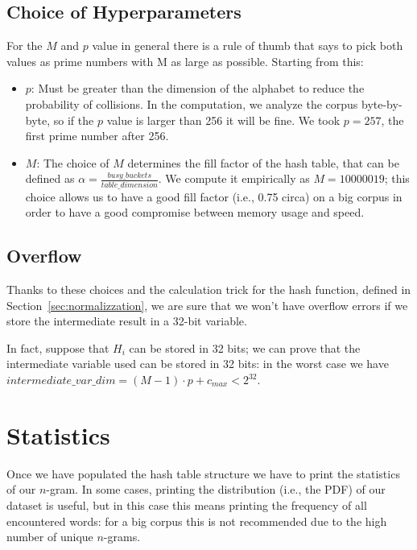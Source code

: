 \subsection{Choice of Hyperparameters}
For the $M$ and $p$ value in general there is a rule of thumb that says to pick both values as prime numbers with M as large as possible. Starting from this:
\begin{itemize}
    \item $p$: Must be greater than the dimension of the alphabet to reduce the probability of collisions. In the computation, we analyze the corpus byte-by-byte, so if the $p$ value is larger than 256 it will be fine. We took $p=257$, the first prime number after 256.
    \item $M$: The choice of $M$ determines the fill factor of the hash table, that can be defined as $\alpha=\tfrac{busy\_buckets}{table\_dimension}$. We compute it empirically as $M=10000019$; this choice allows us to have a good fill factor (i.e., 0.75 circa) on a big corpus in order to have a good compromise between memory usage and speed.
\end{itemize}

\subsection{Overflow}
\label{sec:overflow}
Thanks to these choices and the calculation trick for the hash function, defined in Section~\ref{sec:normalizzation}, we are sure that we won't have overflow errors if we store the intermediate result in a 32-bit variable.

In fact, suppose that $H_i$ can be stored in 32 bits; we can prove that the intermediate variable used can be stored in 32 bits: in the worst case we have $intermediate\_var\_dim=(M-1)\cdot p+c_{max}<2^{32}$.

\section{Statistics}
\label{sec:statistics}
Once we have populated the hash table structure we have to print the statistics of our $n$-gram. In some cases, printing the distribution (i.e., the PDF) of our dataset is useful, but in this case this means printing the frequency of all encountered words: for a big corpus this is not recommended due to the high number of unique $n$-grams.

